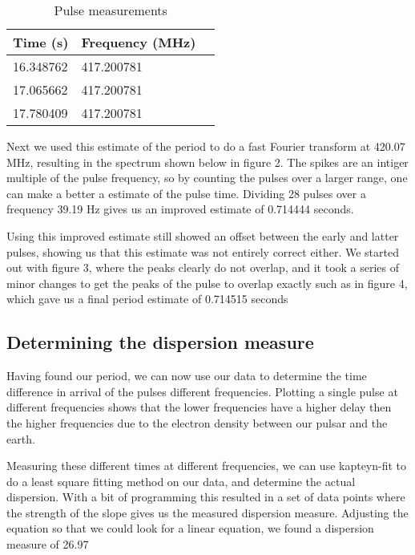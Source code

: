 \documentclass[twoside,twocolumn]{article}
\begin{document}
	
	\begin{table}[h]
		\caption{Pulse measurements}
		\centering
		\begin{tabular}{llr}
			\toprule
			\cmidrule(r){1-2}
			Time (s) & Frequency (MHz) \\
			\midrule
			16.348762 & 417.200781 \\
			17.065662 & 417.200781 \\
			17.780409 & 417.200781\\
			\bottomrule
		\end{tabular}
	\end{table}
	
	Next we used this estimate of the period to do a fast Fourier transform at 420.07 MHz, resulting in the spectrum shown below in figure 2. The spikes are an intiger multiple of the pulse frequency, so by counting the pulses over a larger range, one can make a better a estimate of the pulse time. Dividing 28 pulses over a frequency 39.19 Hz gives us an improved estimate of 0.714444 seconds. 
	

	Using this improved estimate still showed an offset between the early and latter pulses, showing us that this estimate was not entirely correct either. We started out with figure 3, where the peaks clearly do not overlap, and it took a series of minor changes to get the peaks of the pulse to overlap exactly such as in figure 4, which gave us a final period estimate of 0.714515 seconds

	\newpage
	\subsection{Determining the dispersion measure}
	Having found our period, we can now use our data to determine the time difference in arrival of the pulses different frequencies. Plotting a single pulse at different frequencies shows that the lower frequencies have a higher delay then the higher frequencies due to the electron density between our pulsar and the earth.  \cite{Spingola}
	

	
	Measuring these different times at different frequencies, we can use kapteyn-fit to do a least square fitting method on our data, and determine the actual dispersion. With a bit of programming this resulted in a set of data points where the strength of the slope gives us the measured dispersion measure. Adjusting the equation so that we could look for a linear equation, we found a dispersion measure of 26.97  
\end{document}
